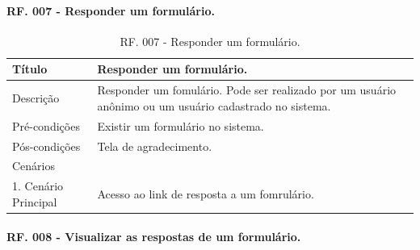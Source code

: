 \documentclass[11pt]{article}
\begin{document}
      \paragraph{RF. 007 - Responder um formulário.} \hspace{10pt}

      \begin{table}[h]
        \begin{center}
          \begin{tabular}{ | p{5cm} | p{10cm} | }
            \hline
            Título\cellcolor{gray} & Responder um formulário.\cellcolor{gray} \\
            \hline
            Descrição & Responder um fomulário. Pode ser realizado por um usuário anônimo ou um usuário cadastrado no sistema. \\
            \hline
            Pré-condições & Existir um formulário no sistema. \\
            \hline
            Pós-condições & Tela de agradecimento. \\
            \hline
            Cenários &   \\
            \hline
            1.  Cenário Principal & Acesso ao link de resposta a um fomrulário. \\
            \hline
          \end{tabular}
          \caption{RF. 007 - Responder um formulário.}
        \end{center}
      \end{table}

  \newpage
  
      \paragraph{RF. 008 - Visualizar as respostas de um formulário.} \hspace{10pt}
\end{document}
